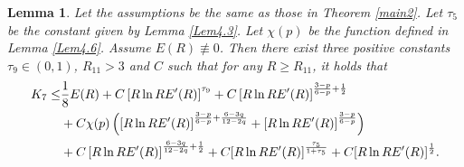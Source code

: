 \documentclass[11pt,reqno]{amsart}
\newtheorem{Lem}{Lemma}[section]
\numberwithin{Thm}{section}
\begin{document}
\begin{Lem}\label{Lem4.9}
Let the assumptions be the same as those in {\rm Theorem \ref{main2}}. Let $\tau_5$ be  the constant given by  {\rm Lemma \ref{Lem4.3}}. Let $\chi(p)$ be the function defined in {\rm Lemma \ref{Lem4.6}}. Assume $E(R)\not\equiv0$. Then there exist three positive constants $\tau_9\in(0,1)$, $R_{11}>3$ and $C$ such that for any $R\geq R_{11}$, it holds that
\begin{align}\label{ine4.35}
K_7 \leq &\frac{1}{8} E(R)+C\left[R\ln RE'(R)\right]^{\tau_9}+C\left[R\ln RE'(R)\right]^{\frac{3-p}{6-p}+\frac{1}{2}}\notag\\
&+C\chi(p)\left(\left[R\ln RE'(R)\right]^{\frac{3-p}{6-p}+\frac{6-3q}{12-2q}}+\left[R\ln RE'(R)\right]^{\frac{3-p}{6-p}}\right)\\
&+C\left[R\ln RE'(R)\right]^{\frac{6-3q}{12-2q}+\frac{1}{2}}+C[R\ln RE'(R)]^\frac{\tau_5}{1+\tau_5}+C[R\ln RE'(R)]^\frac{1}{2}.\notag
\end{align}
\end{Lem}
\end{document}
